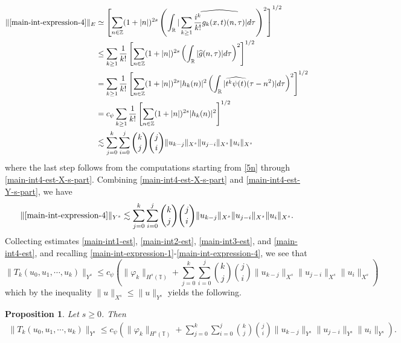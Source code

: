 \documentclass[12pt,reqno]{amsart}
\numberwithin{equation}{section}  %
\numberwithin{figure}{section}
\newcommand{\rr}{\mathbb{R}}
\newcommand{\zz}{\mathbb{Z}}
\newcommand{\ci}{\mathbb{T}}
\newcommand{\wh}{\widehat}
\newcommand{\vp}{\varphi}
\theoremstyle{plain}
\newtheorem{proposition}{Proposition}
\theoremstyle{definition}
\theoremstyle{remark}
\begin{document}
\begin{equation}
\label{main-int4-est-Y-s-part}
  \begin{split}
    \|\eqref{main-int-expression-4}\|_{E}
    & \simeq \left[ \sum_{n \in
    \zz}(1 + | n |)^{2s} \left( \int_{\rr} | \sum_{k \ge 1}
    \wh{\frac{i^{k}}{k!}g_{k}(x,t)(n, \tau)} |d \tau \right)^{2} \right]^{1/2}
    \\
    & \le \sum_{k \ge 1} \frac{1}{k!} \left[ \sum_{n \in \zz} (1 + | n
    |)^{2s} \left( \int_{\rr} | \wh{g}(n, \tau) | d \tau \right)^{2}
    \right]^{1/2}
    \\
    & = \sum_{k \ge 1} \frac{1}{k!} \left[ \sum_{n \in \zz} (1 + | n
    |)^{2s} | h_{k}(n) |^2 \left( \int_{\rr} | \wh{t^{k} \psi(t)}(\tau -
    n^{2}) |d \tau \right)^{2} \right]^{1/2}
    \\
    & = c_{\psi} \sum_{k \ge 1} \frac{1}{k!} \left[ \sum_{n \in \zz} (1 + | n
    |)^{2s} | h_{k}(n) |^2 \right]^{1/2}
    \\
    & \lesssim 
    \sum_{j=0}^{k} \sum_{i=0}^{j} {k \choose j}{j \choose i}
    \|u_{k-j}\|_{X^s} \| u_{j-i}\|_{X^s}
    \| u_i \|_{X^s}
  \end{split}
\end{equation}
%
%
where the last step follows from the computations starting from \eqref{5n}
through \eqref{main-int4-est-X-s-part}.
Combining \eqref{main-int4-est-X-s-part} and \eqref{main-int4-est-Y-s-part}, we
have
%
%
\begin{equation}
\label{main-int4-est}
  \begin{split}
    \|\eqref{main-int-expression-4}\|_{Y^s} \lesssim 
    \sum_{j=0}^{k} \sum_{i=0}^{j} {k \choose j}{j \choose i}
    \|u_{k-j}\|_{X^s} \| u_{j-i}\|_{X^s}
    \| u_i \|_{X^s}.
  \end{split}
\end{equation}
%
%
Collecting estimates \eqref{main-int1-est}, \eqref{main-int2-est}, 
\eqref{main-int3-est}, and \eqref{main-int4-est}, and recalling 
\eqref{main-int-expression-1}-\eqref{main-int-expression-4}, we see that
$$\|T_k(u_0, u_1, \cdots, u_k)\|_{Y^s} \le c_\psi \left( \|\vp_k \|_{H^s(\ci)} + 
\sum_{j=0}^{k} \sum_{i=0}^{j} {k \choose j}{j \choose i} \|u_{k-j}\|_{X^s} \|
u_{j-i}\|_{X^s} \| u_i \|_{X^s}  \right )$$ 
which by the inequality $\|u\|_{X^s} \le \|u\|_{Y^s}$ yields the following.
%
%				 
%
\begin{proposition}
\label{prop:contraction}
  Let $s \ge0$. Then
%
\begin{equation*}
  \begin{split}
    \|T_k(u_0, u_1, \cdots, u_k)\|_{Y^s} \le c_\psi  \left( \|\vp_k
    \|_{H^s(\ci)} +
    \sum_{j=0}^{k} \sum_{i=0}^{j} {k \choose j}{j \choose i}
    \|u_{k-j}\|_{Y^s} \| u_{j-i}\|_{Y^s}
    \| u_i \|_{Y^s}\right).
  \end{split}
\end{equation*}
%
\end{proposition}
\end{document}
